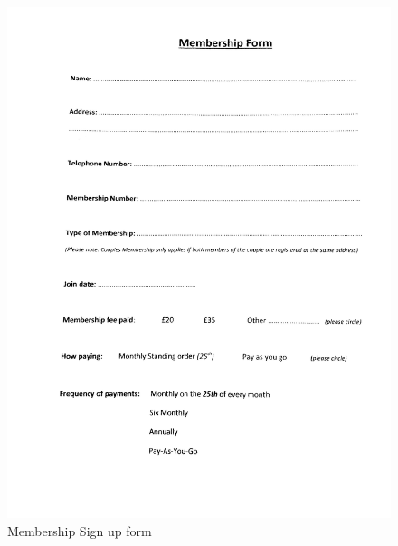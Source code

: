 \begin{figure}[H]
    \includegraphics[width=\textwidth]{MembershipForm.jpg}
    \caption{Membership Sign up form} \label{fig:Membership Sign up Form}
\end{figure}

